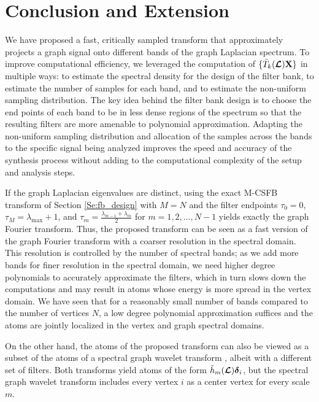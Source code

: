 \documentclass[journal, 10pt]{IEEEtran}
\begin{document}

\section{Conclusion and Extension}
\label{Sec:ongoing}
We have proposed a fast, critically sampled transform that approximately projects a graph signal onto different bands of the graph Laplacian spectrum. To improve computational efficiency, we leveraged the computation of $\{\bar{T}_k(\boldsymbol{\mathcal{L}}){\bf X}\}$ in multiple ways: to estimate the spectral density for the design of the filter bank, to estimate the number of samples for each band, and to estimate the non-uniform sampling distribution. The key idea behind the filter bank design is to choose the end points of each band to be in less dense regions of the spectrum so that the resulting filters are more amenable to polynomial approximation. Adapting the non-uniform sampling distribution and allocation of the samples across the bands to the specific signal being analyzed improves the speed and accuracy of the synthesis process without adding to the computational complexity of the setup and analysis steps. 

If the graph Laplacian eigenvalues are distinct, using the exact M-CSFB transform of Section \ref{Se:fb_design} with $M=N$ and the filter endpoints $\tau_0=0$, $\tau_M = \lambda_{\max}+1$, and $\tau_m=\frac{\lambda_{m-1}+\lambda_m}{2}$ for $m=1,2,\ldots,N-1$ yields exactly the graph Fourier transform. Thus, the proposed transform can be seen as a fast version of the graph Fourier transform with a coarser resolution in the spectral domain. This resolution is controlled by the number of spectral bands; as we add more bands for finer resolution in the spectral domain, we need higher degree polynomials to accurately approximate the filters, which in turn slows down the computations and may result in atoms whose energy is more spread in the vertex domain. We have seen that for a reasonably small number of bands compared to the number of vertices $N$, a low degree polynomial approximation suffices and the atoms are jointly localized in the vertex and graph spectral domains. 

On the other hand, the atoms of the proposed transform can also be viewed as a subset of the atoms of a spectral graph wavelet transform  \cite{hammond2011wavelets}, albeit with a different set of filters. Both transforms yield atoms of the form $\tilde{h}_m(\boldsymbol{\mathcal{L}}){\boldsymbol \delta}_i$, but the spectral graph wavelet transform includes every vertex $i$ as a center vertex for every scale $m$. 
\end{document}
